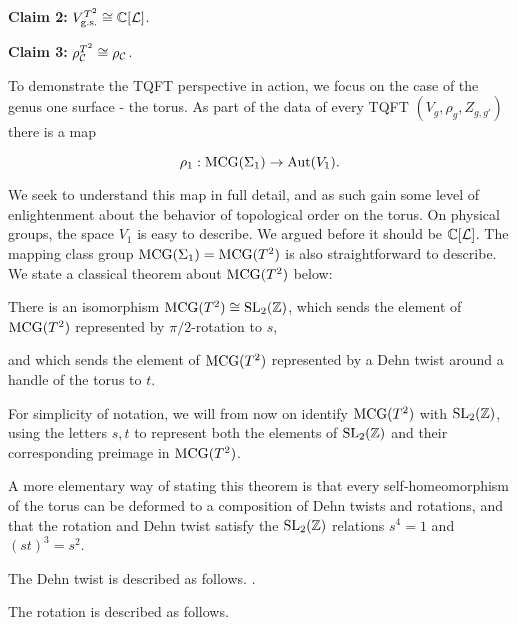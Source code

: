 \textbf{Claim 2:} $V_{\text{g.s.}}^{T^2}\cong {\mathbb C}[{\mathcal L}]$.


\textbf{Claim 3:} $\rho_{{\mathcal C}}^{T^2}\cong \rho_{{\mathcal C}}$.





To demonstrate the TQFT perspective in action, we focus on the case of the genus one surface - the torus. As part of the data of every TQFT $(V_g, \rho_g, Z_{g,g'})$ there is a map

$$\rho_1:\operatorname{MCG}(\Sigma_1)\to \operatorname{Aut}(V_1).$$

We seek to understand this map in full detail, and as such gain some level of enlightenment about the behavior of topological order on the torus. On physical groups, the space $V_1$ is easy to describe. We argued before it should be ${\mathbb C}[{\mathcal L}]$. The mapping class group $\operatorname{MCG}(\Sigma_1)=\operatorname{MCG}(T^2)$ is also straightforward to describe. We state a classical theorem about $\operatorname{MCG}(T^2)$ below:

\begin{thrm} There is an isomorphism $\operatorname{MCG}(T^2)\cong \operatorname{SL}_2({\mathbb Z})$, which sends the element of $\operatorname{MCG}(T^2)$ represented by $\pi/2$-rotation to $s$,


and which sends the element of $\operatorname{MCG}(T^2)$ represented by a Dehn twist around a handle of the torus to $t$. 
\end{thrm}
\begin{rem} For simplicity of notation, we will from now on identify $\operatorname{MCG}(T^2)$ with $\operatorname{SL}_2({\mathbb Z})$, using the letters $s,t$ to represent both the elements of $\operatorname{SL}_2({\mathbb Z})$ and their corresponding preimage in $\operatorname{MCG}(T^2)$.

A more elementary way of stating this theorem is that every self-homeomorphism of the torus can be deformed to a composition of Dehn twists and rotations, and that the rotation and Dehn twist satisfy the $\operatorname{SL}_2({\mathbb Z})$ relations $s^4=1$ and $(st)^3=s^2$.

The Dehn twist is described as follows. .

The rotation is described as follows.
\end{rem}

